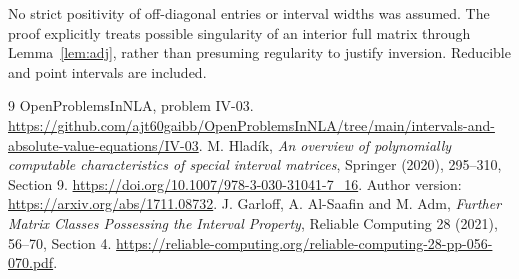 \documentclass[11pt,a4paper]{article}
\theoremstyle{remark}\newtheorem{remark}[theorem]{Remark}
\newcommand{\repo}[1]{\url{https://github.com/ajt60gaibb/OpenProblemsInNLA/tree/main/intervals-and-absolute-value-equations/#1}}
\begin{document}
No strict positivity of off-diagonal entries or interval widths was assumed. The proof explicitly treats possible singularity of an interior full matrix through Lemma~\ref{lem:adj}, rather than presuming regularity to justify inversion. Reducible and point intervals are included.
\begin{thebibliography}{9}
 OpenProblemsInNLA, problem IV-03. \repo{IV-03}.
 M. Hlad\'ik, \emph{An overview of polynomially computable characteristics of special interval matrices}, Springer (2020), 295--310, Section 9. \url{https://doi.org/10.1007/978-3-030-31041-7_16}. Author version: \url{https://arxiv.org/abs/1711.08732}.
 J. Garloff, A. Al-Saafin and M. Adm, \emph{Further Matrix Classes Possessing the Interval Property}, Reliable Computing 28 (2021), 56--70, Section 4. \url{https://reliable-computing.org/reliable-computing-28-pp-056-070.pdf}.
\end{thebibliography}
\end{document}
